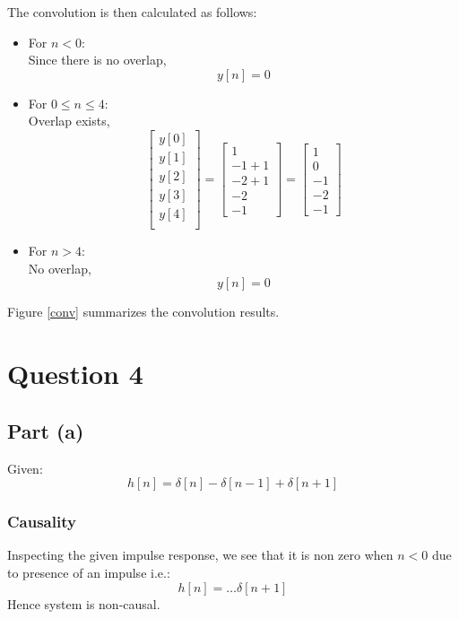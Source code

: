 \documentclass[12pt,letterpaper]{article}
\begin{document}
The convolution is then calculated as  follows:
\begin{itemize}
    \item For $n < 0$:\\
    Since there is no overlap, 
    \[
        y[n] = 0
    \]
    \item  For $0 \leq n \leq 4$:\\
    Overlap exists, 
    \[
    \begin{bmatrix}
        y[0]\\
        y[1]\\
        y[2]\\
        y[3] \\
        y[4]\\
    \end{bmatrix}= 
    \begin{bmatrix}
     1\\
     -1 + 1 \\
     -2 + 1\\
     -2\\
     -1
    \end{bmatrix}
=
\begin{bmatrix}
     1\\
     0 \\
     -1\\
     -2\\
     -1
    \end{bmatrix}
    \]
    
    \item For $n > 4$:\\
    No overlap, 
    \[
        y[n] = 0
    \]
\end{itemize}
Figure \ref{conv} summarizes the convolution results.
\pagebreak
\section*{Question 4}
\subsection*{Part (a)}
Given: 
\[
    h[n] = \delta[n] - \delta[n-1] +\delta[n+1]
\]
\subsubsection*{Causality}
Inspecting the given impulse response, we see that it is non zero when $n<0$ due to presence of an impulse i.e.: 
\[
    h[n] = \dots \delta[n+1]
\]
Hence system is non-causal.
\end{document}
